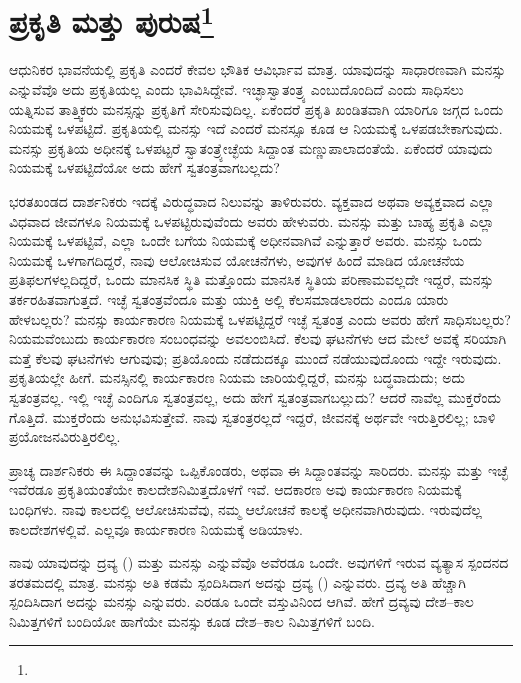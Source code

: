 
\chapter[ಪ್ರಕೃತಿ ಮತ್ತು ಪುರುಷ]{ಪ್ರಕೃತಿ ಮತ್ತು ಪುರುಷ\protect\footnote{}}

ಆಧುನಿಕರ ಭಾವನೆಯಲ್ಲಿ ಪ್ರಕೃತಿ ಎಂದರೆ ಕೇವಲ ಭೌತಿಕ ಆವಿರ್ಭಾವ ಮಾತ್ರ. ಯಾವುದನ್ನು ಸಾಧಾರಣವಾಗಿ ಮನಸ್ಸು ಎನ್ನುವೆವೊ ಅದು ಪ್ರಕೃತಿಯಲ್ಲ ಎಂದು ಭಾವಿಸಿದ್ದೇವೆ. ಇಚ್ಛಾಸ್ವಾತಂತ್ರ್ಯ ಎಂಬುದೊಂದಿದೆ ಎಂದು ಸಾಧಿಸಲು ಯತ್ನಿಸುವ ತಾತ್ತ್ವಿಕರು ಮನಸ್ಸನ್ನು ಪ್ರಕೃತಿಗೆ ಸೇರಿಸುವುದಿಲ್ಲ. ಏಕೆಂದರೆ ಪ್ರಕೃತಿ ಖಂಡಿತವಾಗಿ ಯಾರಿಗೂ ಜಗ್ಗದ ಒಂದು ನಿಯಮಕ್ಕೆ ಒಳಪಟ್ಟಿದೆ. ಪ್ರಕೃತಿಯಲ್ಲಿ ಮನಸ್ಸು ಇದೆ ಎಂದರೆ ಮನಸ್ಸೂ ಕೂಡ ಆ ನಿಯಮಕ್ಕೆ ಒಳಪಡಬೇಕಾಗುವುದು. ಮನಸ್ಸು ಪ್ರಕೃತಿಯ ಅಧೀನಕ್ಕೆ ಒಳಪಟ್ಟರೆ ಸ್ವಾತಂತ್ರ್ಯೇಚ್ಛೆಯ ಸಿದ್ದಾಂತ ಮಣ್ಣುಪಾಲಾದಂತೆಯೆ. ಏಕೆಂದರೆ ಯಾವುದು ನಿಯಮಕ್ಕೆ ಒಳಪಟ್ಟಿದೆಯೋ ಅದು ಹೇಗೆ ಸ್ವತಂತ್ರವಾಗಬಲ್ಲದು?

ಭರತಖಂಡದ ದಾರ್ಶನಿಕರು ಇದಕ್ಕೆ ವಿರುದ್ಧವಾದ ನಿಲುವನ್ನು ತಾಳಿರುವರು. ವ್ಯಕ್ತವಾದ ಅಥವಾ ಅವ್ಯಕ್ತವಾದ ಎಲ್ಲಾ ವಿಧವಾದ ಜೀವಗಳೂ ನಿಯಮಕ್ಕೆ ಒಳಪಟ್ಟಿರುವುವೆಂದು ಅವರು ಹೇಳುವರು. ಮನಸ್ಸು ಮತ್ತು ಬಾಹ್ಯ ಪ್ರಕೃತಿ ಎಲ್ಲಾ ನಿಯಮಕ್ಕೆ ಒಳಪಟ್ಟಿವೆ, ಎಲ್ಲಾ ಒಂದೇ ಬಗೆಯ ನಿಯಮಕ್ಕೆ ಅಧೀನವಾಗಿವೆ ಎನ್ನುತ್ತಾರೆ ಅವರು. ಮನಸ್ಸು ಒಂದು ನಿಯಮಕ್ಕೆ ಒಳಗಾಗದಿದ್ದರೆ, ನಾವು ಆಲೋಚಿಸುವ ಯೋಚನೆಗಳು, ಅವುಗಳ ಹಿಂದೆ ಮಾಡಿದ ಯೋಚನೆಯ ಪ್ರತಿಫಲಗಳಲ್ಲದಿದ್ದರೆ, ಒಂದು ಮಾನಸಿಕ ಸ್ಥಿತಿ ಮತ್ತೊಂದು ಮಾನಸಿಕ ಸ್ಥಿತಿಯ ಪರಿಣಾಮವಲ್ಲದೇ ಇದ್ದರೆ, ಮನಸ್ಸು ತರ್ಕರಹಿತವಾಗುತ್ತದೆ. ಇಚ್ಛೆ ಸ್ವತಂತ್ರವೆಂದೂ ಮತ್ತು ಯುಕ್ತಿ ಅಲ್ಲಿ ಕೆಲಸಮಾಡಲಾರದು ಎಂದೂ ಯಾರು ಹೇಳಬಲ್ಲರು? ಮನಸ್ಸು ಕಾರ್ಯಕಾರಣ ನಿಯಮಕ್ಕೆ ಒಳಪಟ್ಟಿದ್ದರೆ ಇಚ್ಛೆ ಸ್ವತಂತ್ರ ಎಂದು ಅವರು ಹೇಗೆ ಸಾಧಿಸಬಲ್ಲರು? ನಿಯಮವೆಂಬುದು ಕಾರ್ಯಕಾರಣ ಸಂಬಂಧವನ್ನು ಅವಲಂಬಿಸಿದೆ. ಕೆಲವು ಘಟನೆಗಳು ಆದ ಮೇಲೆ ಅವಕ್ಕೆ ಸರಿಯಾಗಿ ಮತ್ತೆ ಕೆಲವು ಘಟನೆಗಳು ಆಗುವುವು; ಪ್ರತಿಯೊಂದು ನಡೆದುದಕ್ಕೂ ಮುಂದೆ ನಡೆಯುವುದೊಂದು ಇದ್ದೇ ಇರುವುದು. ಪ್ರಕೃತಿಯಲ್ಲೇ ಹೀಗೆ. ಮನಸ್ಸಿನಲ್ಲಿ ಕಾರ್ಯಕಾರಣ ನಿಯಮ ಜಾರಿಯಲ್ಲಿದ್ದರೆ, ಮನಸ್ಸು ಬದ್ಧವಾದುದು; ಅದು ಸ್ವತಂತ್ರವಲ್ಲ. ಇಲ್ಲಿ ಇಚ್ಛೆ ಎಂದಿಗೂ ಸ್ವತಂತ್ರವಲ್ಲ, ಅದು ಹೇಗೆ ಸ್ವತಂತ್ರವಾಗಬಲ್ಲುದು? ಆದರೆ ನಾವೆಲ್ಲ ಮುಕ್ತರೆಂದು ಗೊತ್ತಿದೆ. ಮುಕ್ತರೆಂದು ಅನುಭವಿಸುತ್ತೇವೆ. ನಾವು ಸ್ವತಂತ್ರರಲ್ಲದೆ ಇದ್ದರೆ, ಜೀವನಕ್ಕೆ ಅರ್ಥವೇ ಇರುತ್ತಿರಲಿಲ್ಲ; ಬಾಳಿ ಪ್ರಯೋಜನವಿರುತ್ತಿರಲಿಲ್ಲ.

ಪ್ರಾಚ್ಯ ದಾರ್ಶನಿಕರು ಈ ಸಿದ್ದಾಂತವನ್ನು ಒಪ್ಪಿಕೊಂಡರು, ಅಥವಾ ಈ ಸಿದ್ದಾಂತವನ್ನು ಸಾರಿದರು. ಮನಸ್ಸು ಮತ್ತು ಇಚ್ಛೆ ಇವೆರಡೂ ಪ್ರಕೃತಿಯಂತೆಯೇ ಕಾಲದೇಶನಿಮಿತ್ತದೊಳಗೆ ಇವೆ. ಆದಕಾರಣ ಅವು ಕಾರ್ಯಕಾರಣ ನಿಯಮಕ್ಕೆ ಬಂಧಿಗಳು. ನಾವು ಕಾಲದಲ್ಲಿ ಆಲೋಚಿಸುವೆವು, ನಮ್ಮ ಆಲೋಚನೆ ಕಾಲಕ್ಕೆ ಅಧೀನವಾಗಿರುವುದು. ಇರುವುದೆಲ್ಲ ಕಾಲದೇಶಗಳಲ್ಲಿವೆ. ಎಲ್ಲವೂ ಕಾರ್ಯಕಾರಣ ನಿಯಮಕ್ಕೆ ಅಡಿಯಾಳು.

ನಾವು ಯಾವುದನ್ನು ದ್ರವ್ಯ () ಮತ್ತು ಮನಸ್ಸು ಎನ್ನುವೆವೊ ಅವೆರಡೂ ಒಂದೇ. ಅವುಗಳಿಗೆ ಇರುವ ವ್ಯತ್ಯಾಸ ಸ್ಪಂದನದ ತರತಮದಲ್ಲಿ ಮಾತ್ರ. ಮನಸ್ಸು ಅತಿ ಕಡಮೆ ಸ್ಪಂದಿಸಿದಾಗ ಅದನ್ನು ದ್ರವ್ಯ () ಎನ್ನುವರು. ದ್ರವ್ಯ ಅತಿ ಹೆಚ್ಚಾಗಿ ಸ್ಪಂದಿಸಿದಾಗ ಅದನ್ನು ಮನಸ್ಸು ಎನ್ನುವರು. ಎರಡೂ ಒಂದೇ ವಸ್ತುವಿನಿಂದ ಆಗಿವೆ. ಹೇಗೆ ದ್ರವ್ಯವು ದೇಶ–ಕಾಲ ನಿಮಿತ್ತಗಳಿಗೆ ಬಂದಿಯೋ ಹಾಗೆಯೇ ಮನಸ್ಸು ಕೂಡ ದೇಶ–ಕಾಲ ನಿಮಿತ್ತಗಳಿಗೆ ಬಂದಿ.


